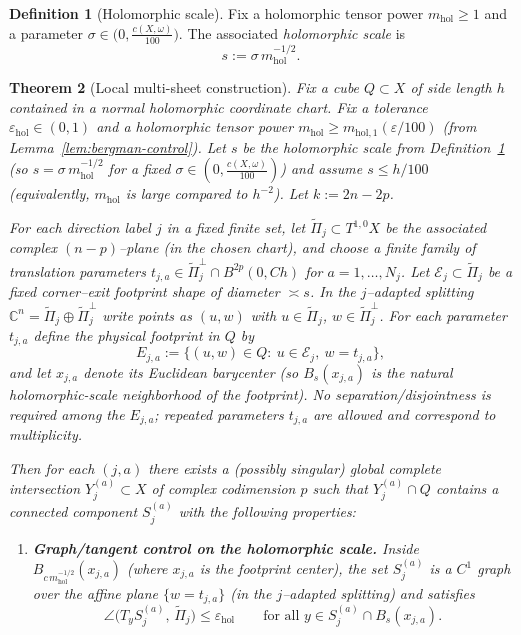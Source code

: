 \documentclass[11pt]{article}
\numberwithin{equation}{section}  %
\theoremstyle{plain}
\newtheorem{theorem}{Theorem}[section]
\theoremstyle{definition}
\newtheorem{definition}[theorem]{Definition}
\theoremstyle{remark}
\newcommand{\C}{\mathbb{C}}
\newcommand{\mhol}{m_{\mathrm{hol}}} %
\begin{document}
\begin{definition}[Holomorphic scale]\label{def:holomorphic-scale}
Fix a holomorphic tensor power $\mhol\ge 1$ and a parameter $\sigma\in\bigl(0,\tfrac{c(X,\omega)}{100}\bigr)$.
The associated \emph{holomorphic scale} is
\[
s:=\sigma\,\mhol^{-1/2}.
\]

\end{definition}
\begin{theorem}[Local multi-sheet construction]\label{thm:local-sheets}
Fix a cube $Q\subset X$ of side length $h$ contained in a normal holomorphic coordinate chart.
Fix a tolerance $\varepsilon_{\mathrm{hol}}\in(0,1)$ and a holomorphic tensor power $\mhol\ge m_{\mathrm{hol},1}(\varepsilon/100)$
(from Lemma~\ref{lem:bergman-control}).  Let $s$ be the holomorphic scale from Definition~\ref{def:holomorphic-scale} (so $s=\sigma\,\mhol^{-1/2}$ for a fixed $\sigma\in(0,\tfrac{c(X,\omega)}{100})$) and assume $s\le h/100$ (equivalently, $\mhol$ is large compared to $h^{-2}$).
Let $k:=2n-2p$.

For each direction label $j$ in a fixed finite set, let $\widetilde\Pi_j\subset T^{1,0}X$ be the associated complex
$(n-p)$--plane (in the chosen chart), and choose a finite family of translation parameters
$t_{j,a}\in \widetilde\Pi_j^\perp\cap B^{2p}(0,Ch)$ for $a=1,\dots,N_j$.
{Let $\mathcal E_j\subset \widetilde\Pi_j$ be a fixed \emph{corner--exit footprint shape} of diameter $\asymp s$.
In the $j$--adapted splitting $\C^n=\widetilde\Pi_j\oplus \widetilde\Pi_j^\perp$ write points as $(u,w)$ with
$u\in \widetilde\Pi_j$, $w\in \widetilde\Pi_j^\perp$.
For each parameter $t_{j,a}$ define the \emph{physical footprint} in $Q$ by
\[
E_{j,a}:=\{(u,w)\in Q:\ u\in \mathcal E_j,\ w=t_{j,a}\},
\]
and let $x_{j,a}$ denote its Euclidean barycenter (so $B_s(x_{j,a})$ is the natural holomorphic-scale neighborhood of the footprint).
No separation/disjointness is required among the $E_{j,a}$; repeated parameters $t_{j,a}$ are allowed and correspond to multiplicity.}

Then for each $(j,a)$ there exists a (possibly singular) global complete intersection
$Y_{j}^{(a)}\subset X$ of complex codimension $p$ such that $Y_{j}^{(a)}\cap Q$ contains a connected component
$S_{j}^{(a)}$ with the following properties:
\begin{enumerate}
\item \textbf{Graph/tangent control on the holomorphic scale.}
Inside $B_{c\,\mhol^{-1/2}}(x_{j,a})$ (where $x_{j,a}$ is the footprint center), the set $S_{j}^{(a)}$
is a $C^1$ graph over the affine plane $\{w=t_{j,a}\}$ (in the $j$--adapted splitting) and satisfies
\[
\angle\bigl(T_y S_{j}^{(a)},\,\widetilde\Pi_j\bigr)\le \varepsilon_{\mathrm{hol}}
\qquad\text{for all }y\in S_{j}^{(a)}\cap B_{s}(x_{j,a}).
\]


\end{enumerate}
\end{theorem}
\end{document}
